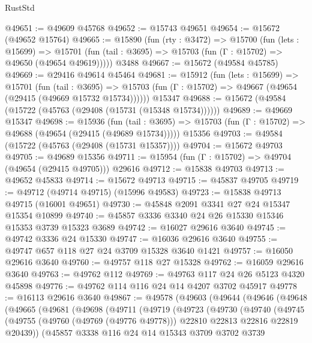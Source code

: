 \begin{lexlean}{RustStd}
\begin{coremodule}
@49651 := @49609 @45768
@49652 := @15743 @49651
@49654 := @15672 (@49652 @15764)
@49665 := @15890
    (fun (rty : @3472) =>
    @15700
      (fun (lets : @15699) =>
      @15701 (fun (tail : @3695) => @15703 (fun (Γ : @15702) => @49650 (@49654 @49619)))))
    @3488
@49667 := @15672 (@49584 @45785)
@49669 := @29416 @49614 @45464
@49681 := @15912
    (fun (lets : @15699) =>
    @15701
      (fun (tail : @3695) =>
      @15703 (fun (Γ : @15702) => @49667 (@49654 (@29415 (@49669 @15732 @15734))))))
    @15347
@49688 := @15672 (@49584 (@15722 (@45763 (@29408 (@15731 (@15348 @15734))))))
@49689 := @49669 @15347
@49698 := @15936
    (fun (tail : @3695) => @15703 (fun (Γ : @15702) => @49688 (@49654 (@29415 (@49689 @15734)))))
    @15356
@49703 := @49584 (@15722 (@45763 (@29408 (@15731 @15357))))
@49704 := @15672 @49703
@49705 := @49689 @15356
@49711 := @15954 (fun (Γ : @15702) => @49704 (@49654 (@29415 @49705))) @29616
@49712 := @15838 @49703
@49713 := @49652 @45833
@49714 := @15672 @49713
@49715 := @45837 @49705
@49719 := @49712 (@49714 @49715) (@15996 @49583)
@49723 := @15838 @49713 @49715 (@16001 @49651)
@49730 := @45848 @2091 @3341 @27 @24 @15347 @15354 @10899
@49740 := @45857 @3336 @3340 @24 @26 @15330 @15346 @15353 @3739 @15323 @3689
@49742 := @16027 @29616 @3640
@49745 := @49742 @3336 @24 @15330
@49747 := @16036 @29616 @3640
@49755 := @49747 @657 @118 @27 @24 @3709 @15328 @3640 @1421
@49757 := @16050 @29616 @3640
@49760 := @49757 @118 @27 @15328
@49762 := @16059 @29616 @3640
@49763 := @49762 @112
@49769 := @49763 @117 @24 @26 @5123 @4320 @45898
@49776 := @49762 @114 @116 @24 @14 @4207 @3702 @45917
@49778 := @16113 @29616 @3640
@49867 := @49578
    (@49603
      (@49644
        (@49646
          (@49648
            (@49665
              (@49681
                (@49698
                  (@49711
                    (@49719
                      (@49723
                        (@49730
                          (@49740
                            (@49745
                              (@49755
                                (@49760 (@49769 (@49776 @49778)))
                                @22810
                                @22813
                                @22816
                                @22819
                                @20439))
                            (@45857
                              @3338
                              @116
                              @24
                              @14
                              @15343
                              @3709
                              @3702
                              @3739

\end{coremodule}
\end{lexlean}
